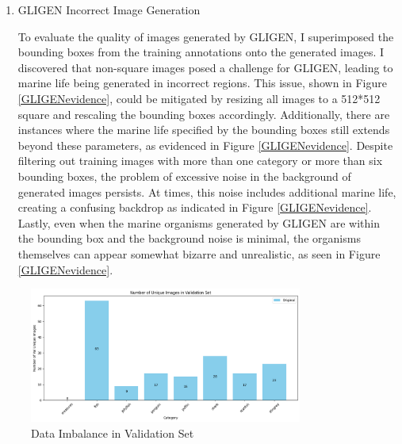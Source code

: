 \documentclass[10pt,a4paper]{article}
\begin{document}
\begin{enumerate}[(a)]
\begin{enumerate}[(1)]
\item GLIGEN Incorrect Image Generation

To evaluate the quality of images generated by GLIGEN, I superimposed the bounding boxes from the training annotations onto the generated images. I discovered that non-square images posed a challenge for GLIGEN, leading to marine life being generated in incorrect regions. This issue, shown in Figure \ref{GLIGENevidence}, could be mitigated by resizing all images to a 512*512 square and rescaling the bounding boxes accordingly. Additionally, there are instances where the marine life specified by the bounding boxes still extends beyond these parameters, as evidenced in Figure \ref{GLIGENevidence}. Despite filtering out training images with more than one category or more than six bounding boxes, the problem of excessive noise in the background of generated images persists. At times, this noise includes additional marine life, creating a confusing backdrop as indicated in Figure \ref{GLIGENevidence}. Lastly, even when the marine organisms generated by GLIGEN are within the bounding box and the background noise is minimal, the organisms themselves can appear somewhat bizarre and unrealistic, as seen in Figure \ref{GLIGENevidence}.
\end{enumerate}

\begin{figure}[H]
\centering
\includegraphics[width=0.8\textwidth]{figure/validation_barplot.png}
\caption{Data Imbalance in Validation Set}
\label{fig:ValSetBarPlot}
\end{figure}


\end{enumerate}
\end{document}
